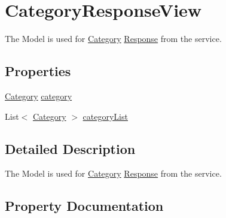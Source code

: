 \hypertarget{classWildlifeTrackingApp_1_1Models_1_1CategoryResponseView}{}\section{Category\+Response\+View}
\label{classWildlifeTrackingApp_1_1Models_1_1CategoryResponseView}


The Model is used for \hyperlink{classWildlifeTrackingApp_1_1Models_1_1Category}{Category} \hyperlink{classWildlifeTrackingApp_1_1Models_1_1Response}{Response} from the service.  


\subsection*{Properties}
\begin{DoxyCompactItemize}
\item 
\hyperlink{classWildlifeTrackingApp_1_1Models_1_1Category}{Category} \hyperlink{classWildlifeTrackingApp_1_1Models_1_1CategoryResponseView_a08b424ccd4f519f4a97826f9d3f3f094}{category}
\item 
List$<$ \hyperlink{classWildlifeTrackingApp_1_1Models_1_1Category}{Category} $>$ \hyperlink{classWildlifeTrackingApp_1_1Models_1_1CategoryResponseView_ac20f04846190de6a34eadd21501afae3}{category\+List}
\end{DoxyCompactItemize}


\subsection{Detailed Description}
The Model is used for \hyperlink{classWildlifeTrackingApp_1_1Models_1_1Category}{Category} \hyperlink{classWildlifeTrackingApp_1_1Models_1_1Response}{Response} from the service. 



\subsection{Property Documentation}
\mbox{\label{classWildlifeTrackingApp_1_1Models_1_1CategoryResponseView_a08b424ccd4f519f4a97826f9d3f3f094}} 

